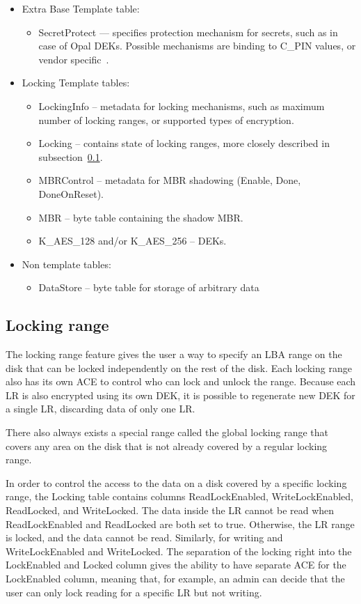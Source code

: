 \begin{itemize}
    \item Extra Base Template table:
    \begin{itemize}
        \item SecretProtect --- specifies protection mechanism for secrets, such as in case of Opal DEKs. Possible mechanisms are binding to C\_PIN values, or vendor specific~\cite{tcg-secrets}.
    \end{itemize}
    \item Locking Template tables:
    \begin{itemize}
        \item LockingInfo -- metadata for locking mechanisms, such as maximum number of locking ranges, or supported types of encryption. 
        \item Locking -- contains state of locking ranges, more closely described in subsection~\ref{locking_range}.
        \item MBRControl -- metadata for MBR shadowing (Enable, Done, DoneOnReset).
        \item MBR -- byte table containing the shadow MBR.
        \item K\_AES\_128 and/or K\_AES\_256 -- DEKs.
    \end{itemize}
    \item Non template tables:
    \begin{itemize}
        \item DataStore -- byte table for storage of arbitrary data
    \end{itemize}
\end{itemize}

\subsection{Locking range}
\label{locking_range}

The locking range feature gives the user a way to specify an LBA range on the disk that can be locked independently on the rest of the disk. Each locking range also has its own ACE to control who can lock and unlock the range. Because each LR is also encrypted using its own DEK, it is possible to regenerate new DEK for a single LR, discarding data of only one LR.


There also always exists a special range called the global locking range that covers any area on the disk that is not already covered by a regular locking range.

In order to control the access to the data on a disk covered by a specific locking range, the Locking table contains columns ReadLockEnabled, WriteLockEnabled, ReadLocked, and WriteLocked. The data inside the LR cannot be read when ReadLockEnabled and ReadLocked are both set to true. Otherwise, the LR range is locked, and the data cannot be read. Similarly, for writing and WriteLockEnabled and WriteLocked. The separation of the locking right into the LockEnabled and Locked column gives the ability to have separate ACE for the LockEnabled column, meaning that, for example, an admin can decide that the user can only lock reading for a specific LR but not writing. 

